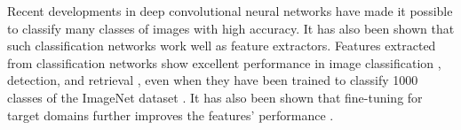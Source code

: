 \documentclass[9pt,technote,compsoc]{./sty/IEEEtran}
\begin{document}
\maketitle


\IEEEdisplaynontitleabstractindextext



%
\IEEEpeerreviewmaketitle

\vspace{1cm}


Recent developments in deep convolutional neural networks have made it possible to classify many classes of images with high accuracy.
It has also been shown that such classification networks work well as feature extractors.
Features extracted from classification networks show excellent performance in image classification \cite{donahue2014decaf}, detection, and retrieval \cite{razavian2014cnn}\cite{liu2015deepindex}, even when they have been trained to classify 1000 classes of the ImageNet dataset \cite{russakovsky2015imagenet}.
It has also been shown that fine-tuning for target domains further improves the features' performance \cite{wan2014deep}\cite{babenko2014neural}.
\end{document}
